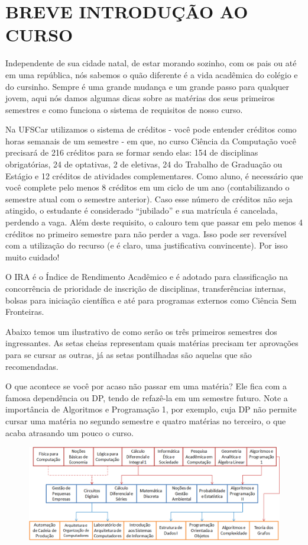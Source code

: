\section{BREVE INTRODUÇÃO AO CURSO}
Independente de sua cidade natal, de estar morando sozinho, com os pais ou até em uma república, nós sabemos o quão diferente é a vida acadêmica do colégio e do cursinho. Sempre é uma grande mudança e um grande passo para qualquer jovem, aqui nós damos algumas dicas sobre as matérias dos seus primeiros semestres e como funciona o sistema de requisitos de nosso curso.

Na UFSCar utilizamos o sistema de créditos - você pode entender créditos como horas semanais de um semestre - em que, no curso Ciência da Computação você precisará de 216 créditos para se formar sendo elas: 154 de disciplinas obrigatórias, 24 de optativas, 2 de eletivas, 24 do Trabalho de Graduação ou Estágio e 12 créditos de atividades complementares. Como aluno, é necessário que você complete pelo menos 8 créditos em um ciclo de um ano (contabilizando o semestre atual com o semestre anterior). Caso esse número de créditos não seja atingido, o estudante é considerado “jubilado” e sua matrícula é cancelada, perdendo a vaga. Além deste requisito, o calouro tem que passar em pelo menos 4 créditos no primeiro semestre para não perder a vaga. Isso pode ser reversível com a utilização do recurso (e é claro, uma justificativa convincente). Por isso muito cuidado!

O IRA é o Índice de Rendimento Acadêmico e é adotado para classificação na concorrência de prioridade de inscrição de disciplinas, transferências internas, bolsas para iniciação científica e até para programas externos como Ciência Sem Fronteiras. 

Abaixo temos um ilustrativo de como serão os três primeiros semestres dos ingressantes. As setas cheias representam quais matérias precisam ter aprovações para se cursar as outras, já as setas pontilhadas são aquelas que são recomendadas.

O que acontece se você por acaso não passar em uma matéria? Ele fica com a
famosa dependência ou DP, tendo de refazê-la em um semestre futuro. Note a
importância de Algoritmos e Programação 1, por exemplo, cuja DP não permite
cursar uma matéria no segundo semestre e quatro matérias no terceiro, o que acaba atrasando um pouco o curso.

\begin{figure}[h]
    \centering
    \includegraphics[width=\textwidth]{./imagem/requisitos_materias.png}
\end{figure}
